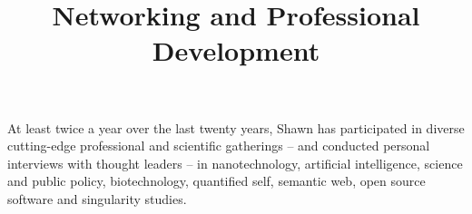 \begin{resume}
\title{ Networking and Professional Development }
\employer{}
\begin{position}
At least twice a year over the last twenty years, Shawn has participated in diverse cutting-edge professional and scientific gatherings  -- and conducted personal interviews with thought leaders -- in nanotechnology, artificial intelligence, science and public policy, biotechnology, quantified self, semantic web, open source software and singularity studies.
\end{position}










\end{resume}
